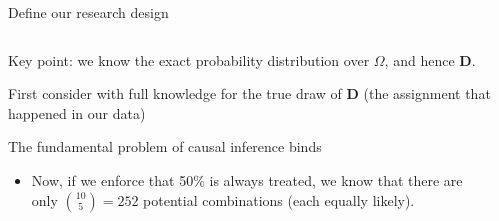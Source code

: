 \documentclass[notes,11pt, aspectratio=169]{beamer}
\newenvironment{wideitemize}{\itemize\addtolength{\itemsep}{10pt}}{\enditemize}
\begin{document}
\begin{frame}{Define our research design}
\begin{columns}[T] %
  \begin{column}{.7\textwidth}
  \begin{wideitemize}
  \item Key point: we know the exact probability distribution over
    $\Omega$, and hence $\mathbf{D}$.
  \item<2-> First consider with full knowledge for the true draw of
    $\mathbf{D}$ (the assignment that happened in our data)
  \item<3-> The fundamental problem of causal inference  binds
    \begin{itemize}
    \item Now, if we enforce that 50\% is always treated, we know that
      there are only ${10 \choose 5}= 252$ potential combinations
      (each equally likely).
    \end{itemize}

    \end{wideitemize}
  \end{column}%
  \hfill%
  \begin{column}{.4\textwidth}


\end{column}
\end{columns}
\end{frame}
\end{document}
